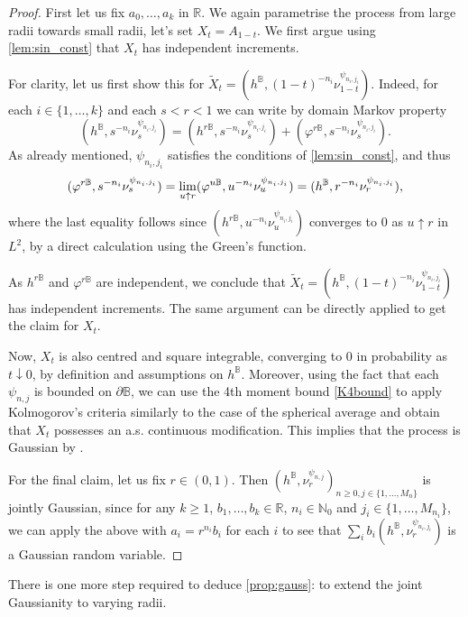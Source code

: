 \documentclass[JEP,XML,SOM,Unicode,published]{cedram}
\theoremstyle{definition}
\newcommand{\R}{\mathbb{R}}
\newcommand{\N}{\mathbb{N}}
\newcommand{\B}{\mathbb{B}}\let\D\B\let\Ub\B
\begin{document}
\begin{proof}
First let us fix $a_0,\dots, a_k$ in $\R$. We again parametrise the process from large radii towards small radii, \ie let's set $X_t = A_{1-t}$. We first argue using \cref{lem:sin_const} that $X_t$ has independent increments.

For clarity, let us first show this for $\tilde X_t = (h^\D,(1-t)^{-n_i}\nu^{\psi_{n_i,j_i}}_{1-t})$. Indeed, for each $i \in \{1, \dots, k\}$ and each $s < r < 1$ we can write by domain Markov property\vspace*{-3pt}
\[
(h^\D,s^{-n_i}\nu^{\psi_{n_i,j_i}}_s) = (h^{r\D},s^{-n_i}\nu^{\psi_{n_i,j_i}}_s) + (\varphi^{r\D},s^{-n_i}\nu^{\psi_{n_i,j_i}}_s).
\]
As already mentioned, $\psi_{n_i,j_i}$ satisfies the conditions of \cref{lem:sin_const}, and thus\vspace*{-3pt}
\[
(\varphi^{r\D},s^{-n_i}\nu^{\psi_{n_i,j_i}}_s) = \lim_{u\uparrow r}(\varphi^{u\D},u^{-n_i}\nu^{\psi_{n_i,j_i}}_u)=(h^\B,r^{-n_i}\nu_r^{\psi_{n_i,j_i}}),\vspace*{-3pt}
\]
where the last equality follows since $(h^{r\B},u^{-n_i}\nu^{\psi_{n_i,j_i}}_u)$ converges to $0$ as $u\uparrow r$ in $L^2$, by a direct calculation using the Green's function.

As $h^{r\D}$ and $\varphi^{r\D}$ are independent, we conclude that {$\tilde X_t = (h^\D,(1-t)^{-n_i}\nu^{\psi_{n_i,j_i}}_{1-t})$ has independent increments.} {The same} argument can be directly applied to get the claim for $X_t$.

Now, $X_t$ is also centred and square integrable, converging to $0$ in probability as~\hbox{$t\!\downarrow\!0$}, by definition and assumptions on $h^\B$. Moreover, {using the fact that each $\psi_{n,j}$ is bound\-ed on $\partial \B$, we can use the 4th moment bound \eqref{K4bound} to apply Kolmogorov's criteria similarly to the case of the spherical average and obtain that $X_t$ possesses an a.s. continuous modification.} This implies that the process is Gaussian by \cite[Th.\,11.4]{Kallenberg}.

For the final claim, let us fix $r\in (0,1)$. Then $(h^\B, \nu^{\psi_{n,j}}_r)_{n \geq 0, j \in \{1, \dots, M_n\}}$ is jointly Gaussian, since for any $k\ge 1$, $b_1,\dots, b_k\in \R$, $n_i\in \N_0$ and $j_i\in \{1,\dots, M_{n_i}\}$, we can apply the above with $a_i=r^{n_i}b_i$ for each $i$ to see that $\sum_i b_i (h^\B,\nu_r^{\psi_{n_i,j_i}})$ is a Gaussian random variable.
\end{proof}

There is one more step required to deduce \cref{prop:gauss}: to extend the joint Gaussianity to varying radii.
\end{document}
